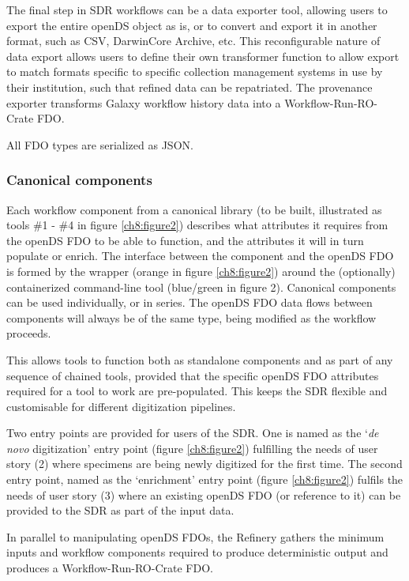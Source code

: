 The final step in SDR workflows can be a data exporter tool, allowing
users to export the entire openDS object as is, or to convert and export
it in another format, such as CSV, DarwinCore Archive, etc. This
reconfigurable nature of data export allows users to define their own
transformer function to allow export to match formats specific to
specific collection management systems in use by their institution, such
that refined data can be repatriated. The provenance exporter transforms
Galaxy workflow history data into a Workflow-Run-RO-Crate FDO.

All FDO types are serialized as JSON.

\subsubsection{Canonical components}\label{canonical-components}

Each workflow component from a canonical library (to be built,
illustrated as tools \#1 - \#4 in figure \ref{ch8:figure2}) describes what attributes it
requires from the openDS FDO to be able to function, and the attributes
it will in turn populate or enrich. The interface between the component
and the openDS FDO is formed by the wrapper (orange in figure \ref{ch8:figure2}) around
the (optionally) containerized command-line tool (blue/green in figure
2). Canonical components can be used individually, or in series. The
openDS FDO data flows between components will always be of the same
type, being modified as the workflow proceeds.

This allows tools to function both as standalone components and as part
of any sequence of chained tools, provided that the specific openDS FDO
attributes required for a tool to work are pre-populated. This keeps the
SDR flexible and customisable for different digitization pipelines.

Two entry points are provided for users of the SDR. One is named as the
`\emph{de novo} digitization' entry point (figure \ref{ch8:figure2}) fulfilling the
needs of user story (2) where specimens are being newly digitized for
the first time. The second entry point, named as the `enrichment' entry
point (figure \ref{ch8:figure2}) fulfils the needs of user story (3) where an existing
openDS FDO (or reference to it) can be provided to the SDR as part of
the input data.

In parallel to manipulating openDS FDOs, the Refinery gathers the
minimum inputs and workflow components required to produce deterministic
output and produces a Workflow-Run-RO-Crate FDO.

